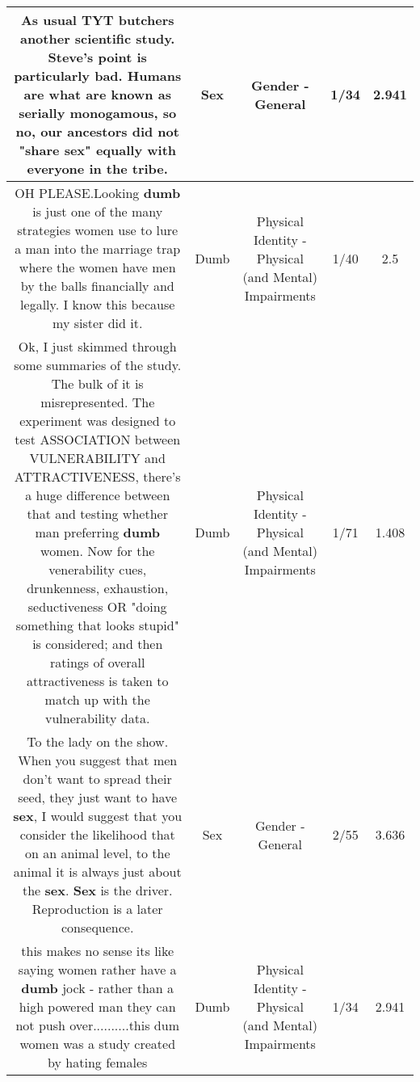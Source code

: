 \documentclass[11pt]{article}
\newlength\mylength
\begin{document}
\begin{center}
\begin{longtable}{|C{.65\mylength}|C{.30\mylength}|C{.12\mylength}|C{.12\mylength}|C{.12\mylength}|}
  \small As usual TYT butchers another scientific study.  Steve's point is particularly bad.  Humans are what are known as serially monogamous, so no, our ancestors did not "share \textbf{sex}" equally with everyone in the tribe.\normalsize   & Sex & Gender - General & 1/34 & 2.941 \\  \hline
  \small OH PLEASE.Looking \textbf{dumb} is just one of the many strategies women use to lure a man into the marriage trap where the women have men by the balls financially and legally. I know this because my sister did it.\normalsize   & Dumb & Physical Identity - Physical (and Mental) Impairments & 1/40 & 2.5 \\  \hline
  \small Ok, I just skimmed through some summaries of the study. The bulk of it is misrepresented. The experiment was designed to test ASSOCIATION between VULNERABILITY and ATTRACTIVENESS, there's a huge difference between that and testing whether man preferring \textbf{dumb} women. Now for the venerability cues, drunkenness, exhaustion, seductiveness OR "doing something that looks stupid" is considered; and then ratings of overall attractiveness is taken to match up with the vulnerability data.\normalsize   & Dumb & Physical Identity - Physical (and Mental) Impairments & 1/71 & 1.408 \\  \hline
  \small To the lady on the show.  When you suggest that men don't want to spread their seed, they just want to have \textbf{sex}, I would suggest that you consider the likelihood that on an animal level, to the animal it is always just about the \textbf{sex}.  \textbf{Sex} is the driver.  Reproduction is a later consequence.\normalsize   & Sex & Gender - General & 2/55 & 3.636 \\  \hline
  \small this makes no sense its like saying women rather have a \textbf{dumb} jock - rather than a high powered man they can not push over..........this dum women was a study created by hating females\normalsize   & Dumb & Physical Identity - Physical (and Mental) Impairments & 1/34 & 2.941 \\  \hline

\end{longtable}
\end{center}
\end{document}
